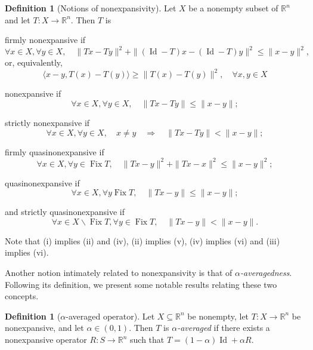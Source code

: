 \documentclass[smallextended,numbook,nospthms]{svjour3}
\theoremstyle{plain}
\theoremstyle{definition}
\newtheorem{definition}[theorem]{Definition}
\def\RR{\mathds R}
\DeclareMathOperator{\Id}{Id}
\DeclareMathOperator{\Fix}{Fix}
\begin{document}
\begin{definition}[Notions of nonexpansivity]\label{def:nonexp}
Let $X$ be a nonempty subset of $\RR^n$ and let $T: X \rightarrow \RR^n$. Then $T$ is
\begin{listi}
    \item firmly nonexpansive if
    \[
    \forall x \in X, \forall y \in X, \quad\|T x-T y\|^{2}+\|(\Id-T) x-(\Id-T) y\|^{2} \leqslant\|x-y\|^{2},
    \]
    or, equivalently,
    \[
    \langle x-y, T(x)-T(y)\rangle \geq\|T(x)-T(y)\|^{2}, \quad \forall x, y \in X
    \]
    \item nonexpansive if
    \[
    \forall x \in X, \forall y \in X, \quad\|T x-T y\| \leqslant\|x-y\|;
    \]
    \item strictly nonexpansive if
    \[
    \forall x \in X,\forall y \in X, \quad x \neq y \quad \Rightarrow \quad\|Tx-Ty\|<\|x-y\|;
    \]
    \item firmly quasinonexpansive if
    \[
    \forall x \in X, \forall y \in \Fix T, \quad\|T x-y\|^{2}+\|T x-x\|^{2} \leqslant\|x-y\|^{2};
    \]
    \item quasinonexpansive if
    \[
    \forall x \in X, \forall y \Fix T, \quad\|T x-y\| \leqslant\|x-y\|;
    \]
    \item and strictly quasinonexpansive if
    \[
    \forall x \in X \backslash \Fix T, \forall y \in \Fix T, \quad\|Tx-y\|<\|x-y\| .
    \]
\end{listi}
Note that (i) implies (ii) and (iv), (ii) implies (v), (iv) implies (vi) and (iii) implies (vi).
\end{definition}

Another notion intimately related to nonexpansivity is that of \emph{$\alpha$-averagedness}. Following its definition, we present some notable results relating these two concepts.

\begin{definition}[$\alpha$-averaged operator]\label{def:alpha-avg}
Let $X \subseteq \RR^{n}$ be nonempty, let $T: X \rightarrow \RR^n$ be nonexpansive, and let $\alpha \in (0,1)$. Then $T$ is \emph{$\alpha$-averaged} if there exists a nonexpansive operator $R: S \rightarrow \RR^n$ such that $T=(1-\alpha) \Id+\alpha R$.
\end{definition}
\end{document}
